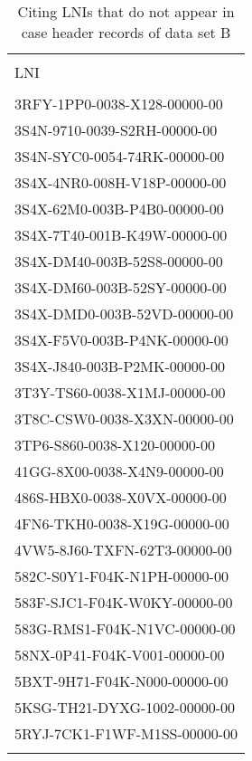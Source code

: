 \documentclass[10pt, letterpaper]{article}
\begin{document}
\begin{spacing}{1.0}
\vspace{0.25in}

\begin{table}[H]
    \centering
    \caption{Citing LNIs that do not appear in case header records of data set B}
    \begin{tabular}{l}
        \hline\\[-8pt]
        LNI\\[2pt]
        \hline\\[-6pt]
        3RFY-1PP0-0038-X128-00000-00\\
        3S4N-9710-0039-S2RH-00000-00\\
        3S4N-SYC0-0054-74RK-00000-00\\
        3S4X-4NR0-008H-V18P-00000-00\\
        3S4X-62M0-003B-P4B0-00000-00\\
        3S4X-7T40-001B-K49W-00000-00\\
        3S4X-DM40-003B-52S8-00000-00\\
        3S4X-DM60-003B-52SY-00000-00\\
        3S4X-DMD0-003B-52VD-00000-00\\
        3S4X-F5V0-003B-P4NK-00000-00\\
        3S4X-J840-003B-P2MK-00000-00\\
        3T3Y-TS60-0038-X1MJ-00000-00\\
        3T8C-CSW0-0038-X3XN-00000-00\\
        3TP6-S860-0038-X120-00000-00\\
        41GG-8X00-0038-X4N9-00000-00\\
        486S-HBX0-0038-X0VX-00000-00\\
        4FN6-TKH0-0038-X19G-00000-00\\
        4VW5-8J60-TXFN-62T3-00000-00\\
        582C-S0Y1-F04K-N1PH-00000-00\\
        583F-SJC1-F04K-W0KY-00000-00\\
        583G-RMS1-F04K-N1VC-00000-00\\
        58NX-0P41-F04K-V001-00000-00\\
        5BXT-9H71-F04K-N000-00000-00\\
        5KSG-TH21-DYXG-1002-00000-00\\
        5RYJ-7CK1-F1WF-M1SS-00000-00\\[4pt]
        \hline\\
    \end{tabular}
    \label{tab:citationsNoHeader}
\end{table}


\end{spacing}
\end{document}
